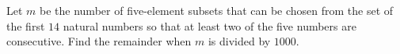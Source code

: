 Let $ m$ be the number of five-element subsets that can be chosen from the set of the first $ 14$ natural numbers so that at least two of the five numbers are consecutive. Find the remainder when $ m$ is divided by $ 1000$.